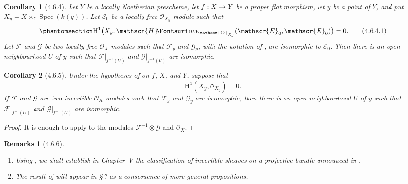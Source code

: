 \documentclass[oneside]{amsart}
\theoremstyle{ega-env-style}
\theoremstyle{ega-thm-env-style}
\newtheorem*{corollary}{Corollary}
\theoremstyle{ega-defn-env-style}
\newtheorem*{remarks}{Remarks}
\def\mathcal{\mathscr}
\def\sh{\mathcal}                   %
\def\HH{\mathrm{H}}                 %
\def\kres{k}                        %
\def\Spec{\operatorname{Spec}}
\renewcommand{\to}{\mathchoice{\longrightarrow}{\rightarrow}{\rightarrow}{\rightarrow}}
\def\shHom{\sh{H}\textup{\kern-2.2pt{\Fontauri\slshape om}}}   %
\let\EGAOriginalLabel\label
\renewcommand{\label}[1]{\phantomsection\EGAOriginalLabel{#1}}
\begin{document}
\begin{corollary}[4.6.4]
\label{III.4.6.4}
Let $Y$ be a locally Noetherian prescheme, let $f:X\to Y$ be a
proper flat morphism, let $y$ be a point of $Y$, and put
$X_y=X\times_Y\Spec(\kres(y))$.  Let $\sh{E}_0$ be a locally free
$\sh{O}_{X_y}$-module such that
\[
\label{III.4.6.4.1}
  \HH^1\bigl(
    X_y,\shHom_{\sh{O}_{X_y}}(\sh{E}_0,\sh{E}_0)
  \bigr)=0.
  \tag{4.6.4.1}
\]
Let $\sh{F}$ and $\sh{G}$ be two locally free $\sh{O}_X$-modules
such that $\sh{F}_y$ and $\sh{G}_y$, with the notation of
, are isomorphic to $\sh{E}_0$.  Then there is an
open neighbourhood $U$ of $y$ such that
$\sh{F}|_{f^{-1}(U)}$ and $\sh{G}|_{f^{-1}(U)}$ are isomorphic.
\end{corollary}

\begin{corollary}[4.6.5]
\label{III.4.6.5}
Under the hypotheses of  on $f$, $X$, and $Y$,
suppose that
\[
  \HH^1(X_y,\sh{O}_{X_y})=0.
\]
If $\sh{F}$ and $\sh{G}$ are two invertible $\sh{O}_X$-modules such
that $\sh{F}_y$ and $\sh{G}_y$ are isomorphic, then there is an open
neighbourhood $U$ of $y$ such that $\sh{F}|_{f^{-1}(U)}$ and
$\sh{G}|_{f^{-1}(U)}$ are isomorphic.
\end{corollary}

\begin{proof}
It is enough to apply  to the modules
$\sh{F}^{-1}\otimes\sh{G}$ and $\sh{O}_X$.
\end{proof}

\begin{remarks}[4.6.6]
\label{III.4.6.6}
\begin{enumerate}
\item[(i)] Using , we shall establish in Chapter~V
  the classification of invertible sheaves on a projective bundle
  announced in .
\item[(ii)] The result of  will appear in \S\,7 as
  a consequence of more general propositions.
\end{enumerate}
\end{remarks}
\end{document}
